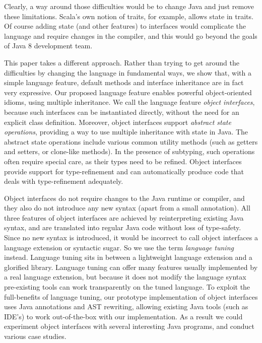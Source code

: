 \noindent Clearly, a way around those difficulties would be to
change Java and just remove these limitations. Scala's own
notion of traits, for example, allows state in traits. Of course adding
state (and other features) to interfaces would complicate the language
and require changes in the compiler, and this would go beyond the
goals of Java 8 development team.

This paper takes a different approach. Rather than trying to get
around the difficulties by changing the language in fundamental ways,
we show that, with a simple language feature, default methods and
interface inheritance are in fact very expressive. Our proposed
language feature enables powerful object-oriented idioms, using
multiple inheritance. We call the language feature \emph{object
  interfaces}, because such interfaces can be instantiated directly,
without the need for an explicit class definition. Moreover, object
interfaces support \emph{abstract state operations}, providing a way
to use multiple inheritance with state in Java. The abstract state
operations include various common utility methods (such as getters and
setters, or clone-like methods). In the presence of subtyping, such
operations often require special care, as their types need to be
refined. Object interfaces provide support for type-refinement and can
automatically produce code that deals with type-refinement
adequately. %

Object interfaces do not require changes to the Java runtime or compiler, 
and they also do not introduce any new syntax (apart from a
small annotation). All three features of object interfaces are
achieved by reinterpreting existing Java syntax, and are translated
into regular Java code without loss of type-safety. Since no new
syntax is introduced, it would be incorrect to call object interfaces
a language extension or syntactic sugar. So we use the term
\emph{language tuning} instead. Language tuning sits in between a
lightweight language extension and a glorified library. Language
tuning can offer many features usually implemented by a real language
extension, but because it does not modify the language syntax
pre-existing tools can work transparently on the tuned language.  To
exploit the full-benefits of language tuning, our prototype
implementation of object interfaces uses Java annotations and AST
rewriting, allowing existing Java tools (such as IDE's) to work
out-of-the-box with our implementation. As a result we could
experiment object interfaces with several interesting Java programs,
and conduct various case studies.

